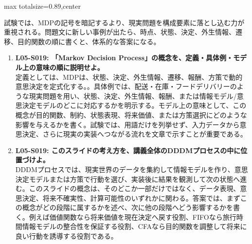 \begin{minipage}[t]{0.58\textwidth}
\begin{adjustbox}{max totalsize={\textwidth}{0.89\textheight},center}
\begin{minipage}{\textwidth}
試験では、MDPの記号を暗記するより、現実問題を構成要素に落とし込む力が重視される。問題文に新しい事例が出たら、時点、状態、決定、外生情報、遷移、目的関数の順に書くと、体系的な答案になる。\par{}\begin{enumerate}\item \textbf{L05-S019: 「Markov Decision Process」の概念を、定義・具体例・モデル上の意味の順に説明せよ。}\\定義としては、MDPは、状態、決定、外生情報、遷移、報酬、方策で動的意思決定を定式化する。。具体例では、配送・在庫・フードデリバリーのような現実問題を用い、状態、決定、外生情報、報酬、または情報モデル/意思決定モデルのどこに対応するかを明示する。モデル上の意味として、この概念が目的関数、制約、状態表現、将来価値、または方策選択にどのような影響を与えるかを書く。試験では、用語だけを列挙せず、入力データから意思決定、さらに現実の実装へつながる流れを文章で示すことが重要である。\item \textbf{L05-S019: このスライドの考え方を、講義全体のDDDMプロセスの中に位置づけよ。}\\DDDMプロセスでは、現実世界のデータを集約して情報モデルを作り、意思決定モデルまたは方策で行動を選び、実装後に結果を観測して次の状態へ進む。このスライドの概念は、そのどこか一部だけではなく、データ表現、意思決定、将来不確実性、計算可能性のいずれかに関わる。答案では、まずこの概念がどの段階に属するかを述べ、次に他の段階へどう影響するかを書く。例えば価値関数なら将来価値を現在決定へ戻す役割、FIFOなら旅行時間情報モデルの整合性を保証する役割、CFAなら目的関数を調整して将来に良い行動を誘導する役割である。\end{enumerate}
\end{minipage}
\end{adjustbox}
\end{minipage}


